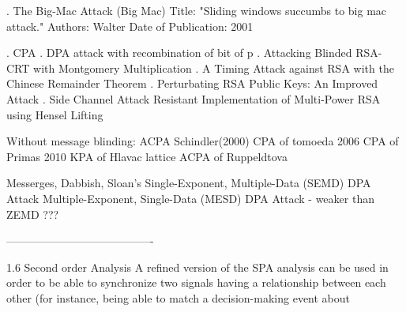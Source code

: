 . The Big-Mac Attack (Big Mac) 
Title:
                                                   	            	                "Sliding windows succumbs to big mac attack."
Authors: 
	                                                          						         Walter
Date of Publication:
 									                                     2001
				            	              



. CPA   
. DPA attack with recombination of bit of p
. Attacking Blinded RSA-CRT with Montgomery Multiplication
. A Timing Attack against RSA with the Chinese Remainder Theorem
. Perturbating RSA Public Keys: An Improved Attack 
. Side Channel Attack Resistant Implementation of Multi-Power RSA using Hensel Lifting

Without message blinding:
ACPA Schindler(2000)
CPA of tomoeda 2006
CPA of Primas 2010
KPA of Hlavac lattice
ACPA of Ruppeldtova



Messerges, Dabbish, Sloan's    
Single-Exponent, Multiple-Data (SEMD) DPA Attack
Multiple-Exponent, Single-Data (MESD) DPA Attack - weaker than ZEMD ???

----------------------------------------

1.6 Second order Analysis
A refined version of the SPA analysis can be used in order to be able to synchronize two signals having
a relationship between each other (for instance, being able to match a decision-making event about
